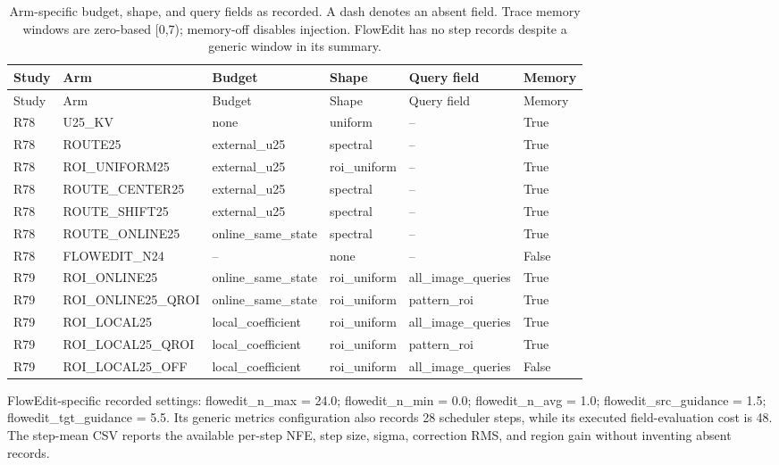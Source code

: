 \begingroup\scriptsize\setlength{\tabcolsep}{2pt}
\begin{longtable}{lp{.23\linewidth}p{.19\linewidth}p{.12\linewidth}p{.19\linewidth}l}
\caption{Arm-specific budget, shape, and query fields as recorded. A dash denotes an absent field. Trace memory windows are zero-based [0,7); memory-off disables injection. FlowEdit has no step records despite a generic window in its summary.}\\
\hline
Study & Arm & Budget & Shape & Query field & Memory \\ \hline
\endfirsthead
\hline
Study & Arm & Budget & Shape & Query field & Memory \\ \hline
\endhead
R78 & U25\_KV & none & uniform & -- & True \\
R78 & ROUTE25 & external\_u25 & spectral & -- & True \\
R78 & ROI\_UNIFORM25 & external\_u25 & roi\_uniform & -- & True \\
R78 & ROUTE\_CENTER25 & external\_u25 & spectral & -- & True \\
R78 & ROUTE\_SHIFT25 & external\_u25 & spectral & -- & True \\
R78 & ROUTE\_ONLINE25 & online\_same\_state & spectral & -- & True \\
R78 & FLOWEDIT\_N24 & -- & none & -- & False \\
R79 & ROI\_ONLINE25 & online\_same\_state & roi\_uniform & all\_image\_queries & True \\
R79 & ROI\_ONLINE25\_QROI & online\_same\_state & roi\_uniform & pattern\_roi & True \\
R79 & ROI\_LOCAL25 & local\_coefficient & roi\_uniform & all\_image\_queries & True \\
R79 & ROI\_LOCAL25\_QROI & local\_coefficient & roi\_uniform & pattern\_roi & True \\
R79 & ROI\_LOCAL25\_OFF & local\_coefficient & roi\_uniform & all\_image\_queries & False \\
\hline\end{longtable}
\endgroup

FlowEdit-specific recorded settings: flowedit\_n\_max = 24.0; flowedit\_n\_min = 0.0; flowedit\_n\_avg = 1.0; flowedit\_src\_guidance = 1.5; flowedit\_tgt\_guidance = 5.5. Its generic metrics configuration also records 28 scheduler steps, while its executed field-evaluation cost is 48. The step-mean CSV reports the available per-step NFE, step size, sigma, correction RMS, and region gain without inventing absent records.

